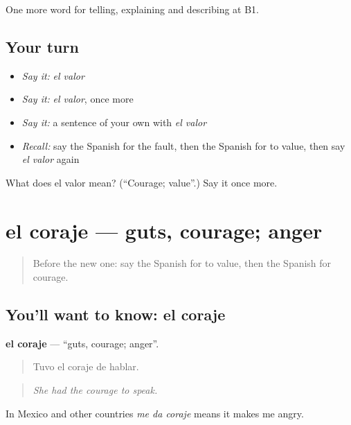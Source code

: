\begin{grammarlens}[title={What you've built}]
One more word for telling, explaining and describing at B1.
\end{grammarlens}

\subsection*{Your turn}
\begin{itemize}
\raggedright
  \item \emph{Say it:} \emph{el valor}
  \item \emph{Say it:} \emph{el valor}, once more
  \item \emph{Say it:} a sentence of your own with \emph{el valor}
  \item \emph{Recall:} say the Spanish for the fault, then the Spanish for to value, then say \emph{el valor} again
\end{itemize}

\begin{tcolorbox}[breakable,colback=teal!4,colframe=teal!35!black,title={Before you move on}]
What does el valor mean? (\textquotedblleft{}Courage; value\textquotedblright{}.) Say it once more.
\end{tcolorbox}
\section[el coraje]{el coraje — guts, courage; anger}

\label{lesson:ES-C722-coraje}



\begin{quote}
Before the new one: say the Spanish for to value, then the Spanish for courage.
\end{quote}

\subsection*{You'll want to know: el coraje}
\textbf{el coraje} — \textquotedblleft{}guts, courage; anger\textquotedblright{}.

\begin{quote}
Tuvo el coraje de hablar.
\end{quote}

\begin{quote}
\emph{She had the courage to speak.}
\end{quote}

In Mexico and other countries \emph{me da coraje} means it makes me angry.


